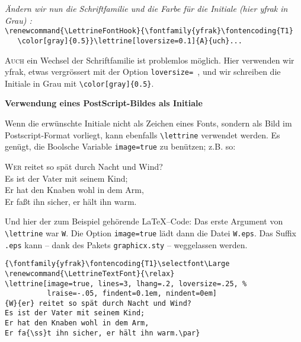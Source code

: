 \documentclass[a4paper,12pt,german]{article}
\begin{document}
\vspace{.5\baselineskip}
\textit{Ändern wir nun die Schriftfamilie und die Farbe für die Initiale
(hier yfrak in Grau) :}\\
\verb+\renewcommand{\LettrineFontHook}{\fontfamily{yfrak}\fontencoding{T1}+\\
\verb+   \color[gray]{0.5}}\lettrine[loversize=0.1]{A}{uch}...+

{%
\renewcommand{\LettrineFontHook}{\fontfamily{yfrak}\fontencoding{T1}
    \color[gray]{0.5}}

\lettrine[loversize=0.1]{A}{uch} ein Wechsel der
Schriftfamilie ist problemlos möglich. Hier verwenden wir yfrak,
etwas vergrössert mit der Option \verb+loversize= +, und wir schreiben
die Initiale in Grau mit \verb+\color[gray]{0.5}+.
\par}

\newpage
\begin{center}
\large\bfseries Verwendung eines PostScript-Bildes als Initiale
\end{center}

\vspace{\baselineskip} Wenn die erwünschte Initiale nicht als Zeichen eines
Fonts, sondern als Bild im Postscript-Format vorliegt, kann ebenfalls
\verb+\lettrine+ verwendet werden. Es genügt,
die Boolsche Variable \texttt{image=true} zu benützen; z.B. so:

\vspace{.5\baselineskip}
{%
\selectfont\Large
\renewcommand{\LettrineTextFont}{\relax}
\lettrine[image=true, lines=3, lhang=.2, loversize=.25, %
          lraise=-.05, findent=0.1em, nindent=0em]
{W}{er} reitet so spät durch Nacht und Wind?\\
Es ist der Vater mit seinem Kind;\\
Er hat den Knaben wohl in dem Arm,\\
Er fa{\ss}t ihn sicher, er hält ihn warm.
\par}

\vspace{\baselineskip} Und hier der zum Beispiel gehörende \LaTeX{}--Code:
Das erste Argument von \verb+\lettrine+ war \verb+W+. Die Option \texttt{image=true}
lädt dann die Datei \verb+W.eps+. Das Suffix \verb+.eps+ kann -- dank des
Pakets \verb+graphicx.sty+ -- weggelassen werden.

\begin{verbatim}
{\fontfamily{yfrak}\fontencoding{T1}\selectfont\Large
\renewcommand{\LettrineTextFont}{\relax}
\lettrine[image=true, lines=3, lhang=.2, loversize=.25, %
          lraise=-.05, findent=0.1em, nindent=0em]
{W}{er} reitet so spät durch Nacht und Wind?
Es ist der Vater mit seinem Kind;
Er hat den Knaben wohl in dem Arm,
Er fa{\ss}t ihn sicher, er hält ihn warm.\par}
\end{verbatim}
\end{document}
